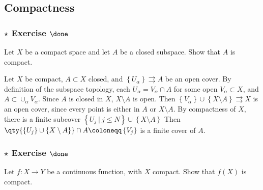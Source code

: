 \hypertarget{compactness}{%
\subsection{Compactness}\label{compactness}}

\hypertarget{star-exercise-done}{%
\subsubsection{\texorpdfstring{\(\star\) Exercise
\(\done\)}{\textbackslash star Exercise \textbackslash done}}\label{star-exercise-done}}

Let \(X\) be a compact space and let \(A\) be a closed subspace. Show
that \(A\) is compact.

\begin{solution}

\hfill

\begin{concept}

\hfill

\end{concept}

Let \(X\) be compact, \(A\subset X\) closed, and
\(\left\{{U_\alpha}\right\} \rightrightarrows A\) be an open cover. By
definition of the subspace topology, each \(U_\alpha = V_\alpha \cap A\)
for some open \(V_\alpha \subset X\), and
\(A\subset \cup_\alpha V_\alpha\). Since \(A\) is closed in \(X\),
\(X\setminus A\) is open. Then
\(\left\{{V_\alpha}\right\}\cup\left\{{X\setminus A}\right\}\rightrightarrows X\)
is an open cover, since every point is either in \(A\) or
\(X\setminus A\). By compactness of \(X\), there is a finite subcover
\(\left\{{U_j {~\mathrel{\Big|}~}j\leq N}\right\}\cup\left\{{X\setminus A}\right\}\)
Then
\(\qty{\left\{{U_j}\right\} \cup\left\{{X\setminus A}\right\}} \cap A \coloneqq\left\{{V_j}\right\}\)
is a finite cover of \(A\).

\end{solution}

\hypertarget{star-exercise-done-1}{%
\subsubsection{\texorpdfstring{\(\star\) Exercise
\(\done\)}{\textbackslash star Exercise \textbackslash done}}\label{star-exercise-done-1}}

Let \(f : X \to Y\) be a continuous function, with \(X\) compact. Show
that \(f(X)\) is compact.

